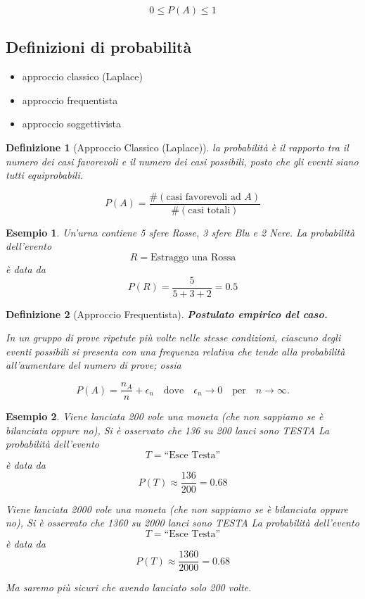 \documentclass[
  11pt,
]{book}
\providecommand{\tightlist}{%
  \setlength{\itemsep}{0pt}\setlength{\parskip}{0pt}}
\theoremstyle{mytheoremstyle}
\theoremstyle{mydefstyle}
\newtheorem{definition}{Definizione}[section]
\newtheorem{example}{{Esempio}}[section]
\begin{document}
\[
0\le P(A)\le 1
\]

\subsection{Definizioni di probabilità}\label{definizioni-di-probabilituxe0}

\begin{itemize}
\tightlist
\item
  approccio classico (Laplace)
\item
  approccio frequentista
\item
  approccio soggettivista
\end{itemize}

\begin{info}

\begin{definition}[Approccio Classico (Laplace)]
la probabilità è il rapporto tra il numero dei casi favorevoli e il
numero dei casi possibili, posto che gli eventi siano tutti
equiprobabili.

\[
P(A)=\frac{\#(\text{casi favorevoli ad $A$} )}{\#(\text{casi totali} )}
\]
\end{definition}

\end{info}

\begin{example}
Un'urna contiene 5 sfere Rosse, 3 sfere Blu e 2 Nere. La probabilità
dell'evento
\[
R =\text{Estraggo una Rossa}
\]
è data da
\[
P(R)=\frac{5}{5+3+2}=0.5
\]
\end{example}

\begin{info}

\begin{definition}[Approccio Frequentista]
\textbf{Postulato empirico del caso.}

In un gruppo di prove ripetute più volte \emph{nelle stesse condizioni},
ciascuno degli eventi possibili si presenta con una frequenza relativa
che tende alla probabilità all'aumentare del numero di prove; ossia

\[
P(A)=\frac{n_A}{n}+\epsilon_n
\quad\mbox{dove}\quad \epsilon_{n}\to 0 \quad\mbox{per}\quad n\to\infty .
\]
\end{definition}

\end{info}

\begin{example}
Viene lanciata 200 vole una moneta (che non sappiamo se è bilanciata
oppure no), Si è osservato che 136 su 200 lanci sono TESTA La
probabilità dell'evento \[
T =\text{“Esce Testa''}
\] è data da
\[
P(T)\approx\frac{136}{200}=0.68
\]

Viene lanciata 2000 vole una moneta (che non sappiamo se è bilanciata
oppure no), Si è osservato che 1360 su 2000 lanci sono TESTA La
probabilità dell'evento
\[
T =\text{“Esce Testa''}
\]
è data da
\[
P(T)\approx\frac{1360}{2000}=0.68
\]

Ma saremo più \emph{sicuri} che avendo lanciato solo 200 volte.
\end{example}
\end{document}
